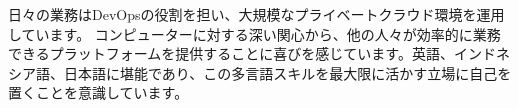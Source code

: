 

\begin{cvparagraph}

日々の業務はDevOpsの役割を担い、大規模なプライベートクラウド環境を運用しています。 コンピューターに対する深い関心から、他の人々が効率的に業務できるプラットフォームを提供することに喜びを感じています。英語、インドネシア語、日本語に堪能であり、この多言語スキルを最大限に活かす立場に自己を置くことを意識しています。
\end{cvparagraph}
